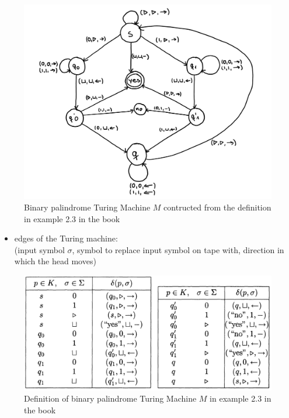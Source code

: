 \documentclass[a4]{scrartcl}
\begin{document}
\begin{figure}[H]
\begin{center}
\includegraphics[scale=0.8]{palindrometm.png}
\end{center}
\caption{Binary palindrome Turing Machine $M$ contructed from the definition in example 2.3 in the book \cite{book}}
\end{figure}

\begin{itemize}
\item edges of the Turing machine: \\
(input symbol $\sigma$, symbol to replace input symbol on tape with, direction in which the head moves)
\end{itemize}

\begin{figure}[H]
\begin{center}
\includegraphics[scale=0.5]{palindrome.jpg}
\end{center}
\caption{Definition of binary palindrome Turing Machine $M$ in example 2.3 in the book \cite{book}}
\end{figure}
\end{document}
